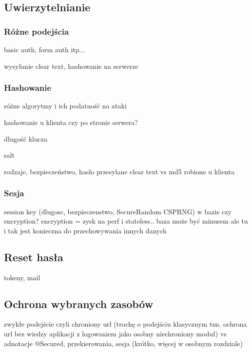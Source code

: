 \documentclass[11pt]{aghdpl}
\begin{document}
\subsection{Uwierzytelnianie}


\subsubsection{Różne podejścia}

basic auth, form auth itp...

wysyłanie clear text, hashowanie na serwerze

\subsubsection{Hashowanie}

różne algorytmy i ich podatność na ataki

hashowanie u klienta czy po stronie serwera?

długość klucza

salt

rodzaje, bezpieczeństwo, haslo przesylane clear text vs md5 robione u klienta

\subsubsection{Sesja}

session key (dlugosc, bezpieczenstwo, SecureRandom CSPRNG) w bazie czy encryption? encryption = zysk na perf i stateless.. baza może być minusem ale tu i tak jest konieczna do przechowywania innych danych

\subsection{Reset hasła}

tokeny, mail

\subsection{Ochrona wybranych zasobów}

zwykłe podejście czyli chroniony url (trochę o podejściu klasycznym tzn. ochrona url bez wiedzy aplikacji z logowaniem jako osobny niechroniony moduł) vs adnotacje
@Secured, przekierowania, sesja (krótko, więcej w osobnym rozdziale)
\end{document}
